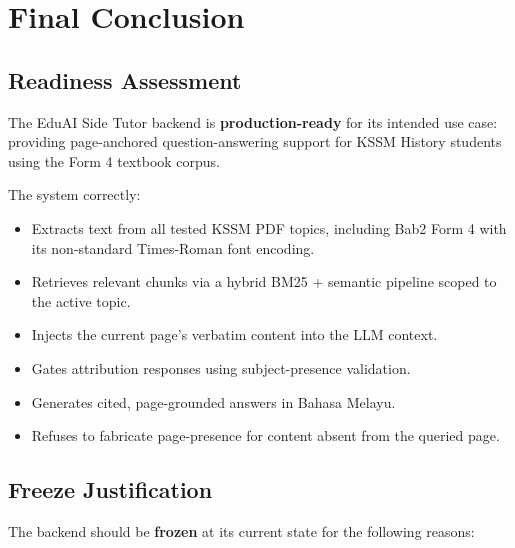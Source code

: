 \documentclass[12pt, a4paper]{report}
\begin{document}
\chapter{Final Conclusion}

\section{Readiness Assessment}

The EduAI Side Tutor backend is \textbf{production-ready} for its intended use
case: providing page-anchored question-answering support for KSSM History
students using the Form 4 textbook corpus.

The system correctly:
\begin{itemize}[noitemsep]
  \item Extracts text from all tested KSSM PDF topics, including Bab2 Form 4
        with its non-standard Times-Roman font encoding.
  \item Retrieves relevant chunks via a hybrid BM25 + semantic pipeline scoped
        to the active topic.
  \item Injects the current page's verbatim content into the LLM context.
  \item Gates attribution responses using subject-presence validation.
  \item Generates cited, page-grounded answers in Bahasa Melayu.
  \item Refuses to fabricate page-presence for content absent from the queried page.
\end{itemize}

\section{Freeze Justification}

The backend should be \textbf{frozen} at its current state for the following
reasons:
\end{document}
